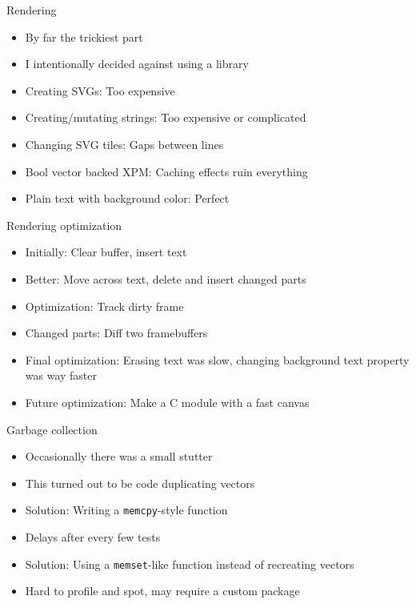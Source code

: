 \documentclass[presentation]{beamer}
\begin{document}
\begin{frame}[label={sec:org7ccc69e}]{Rendering}
\begin{itemize}
\item By far the trickiest part
\item I intentionally decided against using a library
\item Creating SVGs: Too expensive
\item Creating/mutating strings: Too expensive or complicated
\item Changing SVG tiles: Gaps between lines
\item Bool vector backed XPM: Caching effects ruin everything
\item Plain text with background color: Perfect
\end{itemize}
\end{frame}

\begin{frame}[label={sec:org2f0cc04}]{Rendering optimization}
\begin{itemize}
\item Initially: Clear buffer, insert text
\item Better: Move across text, delete and insert changed parts
\item Optimization: Track dirty frame
\item Changed parts: Diff two framebuffers
\item Final optimization: Erasing text was slow, changing background text
property was way faster
\item Future optimization: Make a C module with a fast canvas
\end{itemize}
\end{frame}

\begin{frame}[fragile,label={sec:org5a25466}]{Garbage collection}
 \begin{itemize}
\item Occasionally there was a small stutter
\item This turned out to be code duplicating vectors
\item Solution: Writing a \texttt{memcpy}-style function
\item Delays after every few tests
\item Solution: Using a \texttt{memset}-like function instead of recreating
vectors
\item Hard to profile and spot, may require a custom package
\end{itemize}
\end{frame}
\end{document}
